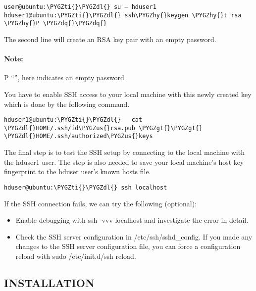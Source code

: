 \documentclass[letterpaper,10pt,english]{sphinxmanual}
\def\PYGZus{\char`\_}
\def\PYGZgt{\char`\>}
\def\PYGZdl{\char`\$}
\def\PYGZhy{\char`\-}
\def\PYGZdq{\char`\"}
\def\PYGZti{\char`\~}
\begin{document}
\begin{Verbatim}[commandchars=\\\{\}]
user@ubuntu:\PYGZti{}\PYGZdl{} su – hduser1
hduser1@ubuntu:\PYGZti{}\PYGZdl{} ssh\PYGZhy{}keygen \PYGZhy{}t rsa \PYGZhy{}P \PYGZdq{}\PYGZdq{}
\end{Verbatim}

The second line will create an RSA key pair with an empty password.


\paragraph{Note:}
\label{hadoop:id1}
P “”, here indicates an empty password

You have to enable SSH access to your local machine with this newly created key which is done by the following command.

\begin{Verbatim}[commandchars=\\\{\}]
hduser1@ubuntu:\PYGZti{}\PYGZdl{}   cat \PYGZdl{}HOME/.ssh/id\PYGZus{}rsa.pub \PYGZgt{}\PYGZgt{} \PYGZdl{}HOME/.ssh/authorized\PYGZus{}keys
\end{Verbatim}

The final step is to test the SSH setup by connecting to the local machine with the hduser1 user.
The step is also needed to save your local machine’s host key fingerprint to the hduser user’s known hosts file.

\begin{Verbatim}[commandchars=\\\{\}]
hduser@ubuntu:\PYGZti{}\PYGZdl{} ssh localhost
\end{Verbatim}

If the SSH connection fails, we can try the following (optional):
\begin{itemize}
\item {} 
Enable debugging with ssh -vvv localhost and investigate the error in detail.

\item {} 
Check the SSH server configuration in /etc/ssh/sshd\_config.  If you made any changes to the SSH server configuration file, you can force a configuration reload with sudo /etc/init.d/ssh reload.

\end{itemize}


\subsection{INSTALLATION}
\label{hadoop:installation}
\end{document}
